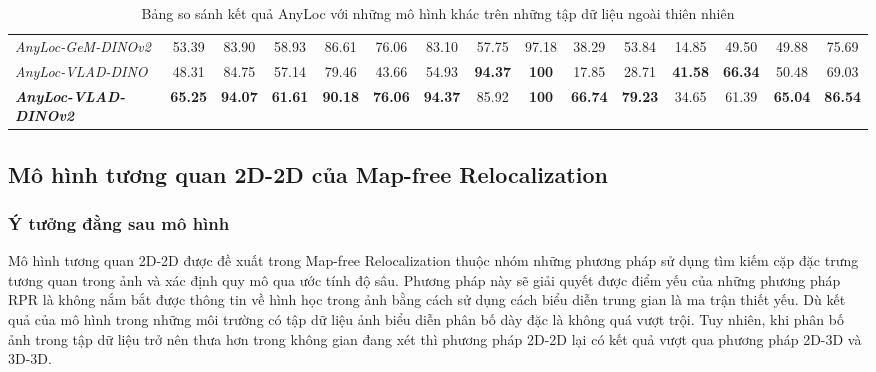 \begin{table}[H]
{\begin{tabular}{lcccccccccccccc}
\rowcolor[HTML]{FFCE93} 
\textit{AnyLoc-GeM-DINOv2}             & 53.39                         & 83.90                        & 58.93                            & 86.61                            & 76.06                          & 83.10                         & 57.75                           & 97.18                          & 38.29                        & 53.84                        & 14.85                                                   & 49.50                                                   & 49.88                    & 75.69                    \\
\rowcolor[HTML]{FFCE93} 
\textit{AnyLoc-VLAD-DINO}              & 48.31                         & 84.75                        & 57.14                            & 79.46                            & 43.66                          & 54.93                         & \textbf{94.37}                  & \textbf{100}                            & 17.85                        & 28.71                        & \textbf{41.58}                                          & \textbf{66.34}                                          & 50.48                    & 69.03                    \\
\rowcolor[HTML]{FFCE93} 
\textit{\textbf{AnyLoc-VLAD-DINOv2}}   & \textbf{65.25}                & \textbf{94.07}               & \textbf{61.61}                   & \textbf{90.18}                   & \textbf{76.06}                 & \textbf{94.37}                & 85.92                           & \textbf{100}                   & \textbf{66.74}               & \textbf{79.23}               & 34.65                                                   & 61.39                                                   & \textbf{65.04}           & \textbf{86.54}          
\end{tabular}}
\caption{Bảng so sánh kết quả AnyLoc với những mô hình khác trên những tập dữ liệu ngoài thiên nhiên}
\end{table}

\subsection{Mô hình tương quan 2D-2D của Map-free Relocalization \cite{arnold2022mapfree}}
\subsubsection*{Ý tưởng đằng sau mô hình}
Mô hình tương quan 2D-2D được đề xuất trong Map-free Relocalization thuộc nhóm những phương pháp sử dụng tìm kiếm cặp đặc trưng tương quan trong ảnh và xác định quy mô qua ước tính độ sâu. Phương pháp này sẽ giải quyết được điểm yếu của những phương pháp RPR là không nắm bắt được thông tin về hình học trong ảnh bằng cách sử dụng cách biểu diễn trung gian là ma trận thiết yếu. Dù kết quả của mô hình trong những môi trường có tập dữ liệu ảnh biểu diễn phân bố dày đặc là không quá vượt trội. Tuy nhiên, khi phân bố ảnh trong tập dữ liệu trở nên thưa hơn trong không gian đang xét thì phương pháp 2D-2D lại có kết quả vượt qua phương pháp 2D-3D và 3D-3D. 
